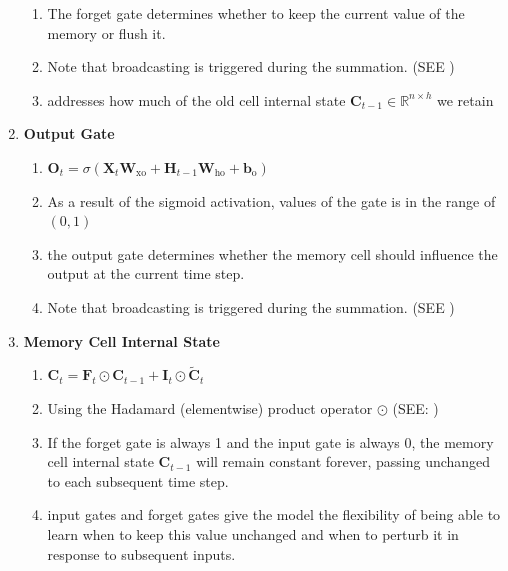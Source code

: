 \begin{enumerate}[itemsep=0.15cm]
\begin{enumerate}
        \item The forget gate determines whether to keep the current value of the memory or flush it.

        \item Note that broadcasting is triggered during the summation. (SEE )

        \item addresses how much of the old cell internal state $\mathbf{C}_{t-1} \in \mathbb{R}^{n \times h}$ we retain
    \end{enumerate}

    \item \textbf{Output Gate}
    \begin{enumerate}
        \item $\mathbf{O}_t = \sigma(\mathbf{X}_t \mathbf{W}_{\textrm{xo}} + \mathbf{H}_{t-1} \mathbf{W}_{\textrm{ho}} + \mathbf{b}_\textrm{o})$
    
        \item As a result of the sigmoid activation, values of the gate is in the range of $(0,1)$

        \item the output gate determines whether the memory cell should influence the output at the current time step.

        \item Note that broadcasting is triggered during the summation. (SEE )
    \end{enumerate}


    \item \textbf{Memory Cell Internal State}
    \begin{enumerate}
        \item $\mathbf{C}_t = \mathbf{F}_t \odot \mathbf{C}_{t-1} + \mathbf{I}_t \odot \tilde{\mathbf{C}}_t$

        \item Using the Hadamard (elementwise) product operator $\odot$ (SEE: )

        \item If the forget gate is always 1 and the input gate is always 0, the memory cell internal state $\mathbf{C}_{t-1}$ will remain constant forever, passing unchanged to each subsequent time step.

        \item input gates and forget gates give the model the flexibility of being able to learn when to keep this value unchanged and when to perturb it in response to subsequent inputs.
    \end{enumerate}


\end{enumerate}
